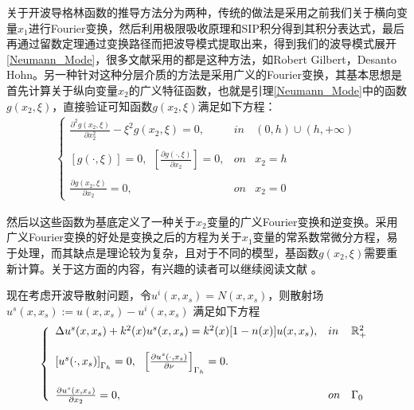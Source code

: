 \begin{remark}
关于开波导格林函数的推导方法分为两种，传统的做法是采用之前我们关于横向变量$x_1$进行Fourier变换，然后利用极限吸收原理和SIP积分得到其积分表达式，最后再通过留数定理通过变换路径而把波导模式提取出来，得到我们的波导模式展开
\ref{Neumann_Mode}，很多文献采用的都是这种方法，如Robert Gilbert\cite{Robert2007Inverse}，Desanto Hohn\cite{Desanto1992Scalar}。另一种针对这种分层介质的方法是采用广义的Fourier变换，其基本思想是首先计算关于纵向变量$x_2$的广义特征函数，也就是引理\ref{Neumann_Mode}中的函数$g(x_2,\xi)$，直接验证可知函数$g(x_2,\xi)$满足如下方程：
\begin{eqnarray*}
\left\{
\begin{array}{lll}
\frac{\partial^2 g(x_2,\xi)}{\partial x_2^2}-\xi^2g(x_2,\xi)=0,&in&(0,h)\cup(h,+\infty)\\
& &\\
\left[g(\cdot,\xi)\right]=0,\ \
\left[\frac{\partial g(\cdot,\xi)}{\partial x_2}\right]=0,&on&x_2=h\\
& &\\
\frac{\partial g(x_2,\xi)}{\partial x_2}=0,&on&x_2=0
\end{array}
\right.
\end{eqnarray*}

然后以这些函数为基底定义了一种关于$x_2$变量的广义Fourier变换和逆变换。采用广义Fourier变换的好处是变换之后的方程为关于$x_1$变量的常系数常微分方程，易于处理，而其缺点是理论较为复杂，且对于不同的模型，基函数$g(x_2,\xi)$需要重新计算。关于这方面的内容，有兴趣的读者可以继续阅读文献
\cite{Magnanini2000Wave,Ammari2003Resonances,Ammari2005Reconstruction,
Ciraolo2008NON,Ciraolo2009A1,Ciraolo2009A2,Weder1991Spectral,Hazard2009A}。
\end{remark}
现在考虑开波导散射问题，令$u^i(x,x_s)=N(x,x_s)$，则散射场$u^s(x,x_s):=u(x,x_s)-u^i(x,x_s)$ 满足如下方程
\begin{eqnarray}\label{wg_scatterfield}
\left\{
\begin{array}{lll}
 \Delta u^s(x,x_s)+k^2(x)u^s(x,x_s)=k^2(x)[1-n(x)]u(x,x_s),&in&\mathbb{R}^2_+ \\
  & &\\
  \left[u^s(\cdot,x_s)\right]_{\Gamma_h}=0,\ \ \left[\frac{\partial u^s(\cdot,x_s)}{\partial\nu}\right]_{\Gamma_h}=0.\\
 & &\\
 \frac{\partial u^s(x,x_s)}{\partial x_2}=0,&on&\Gamma_0
\end{array}
\right.
\end{eqnarray}


